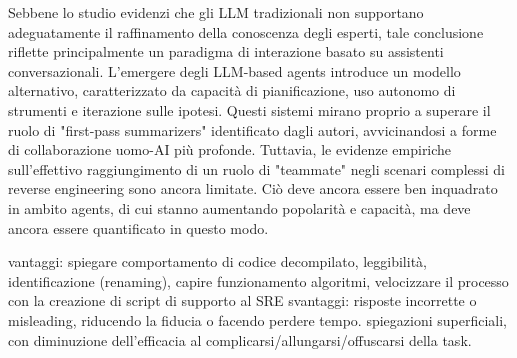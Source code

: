 Sebbene lo studio evidenzi che gli LLM tradizionali non supportano adeguatamente il raffinamento della conoscenza degli esperti, tale conclusione riflette principalmente un paradigma di interazione basato su assistenti conversazionali. L'emergere degli LLM-based agents introduce un modello alternativo, caratterizzato da capacità di pianificazione, uso autonomo di strumenti e iterazione sulle ipotesi. Questi sistemi mirano proprio a superare il ruolo di "first-pass summarizers" identificato dagli autori, avvicinandosi a forme di collaborazione uomo-AI più profonde. Tuttavia, le evidenze empiriche sull'effettivo raggiungimento di un ruolo di "teammate" negli scenari complessi di reverse engineering sono ancora limitate. Ciò deve ancora essere ben inquadrato in ambito agents, di cui stanno aumentando popolarità e capacità, ma deve ancora essere quantificato in questo modo. 

vantaggi: spiegare comportamento di codice decompilato, leggibilità, identificazione (renaming), capire funzionamento algoritmi, velocizzare il processo con la creazione di script di supporto al SRE
svantaggi: risposte incorrette o misleading, riducendo la fiducia o facendo perdere tempo. spiegazioni superficiali, con diminuzione dell'efficacia al complicarsi/allungarsi/offuscarsi della task.

